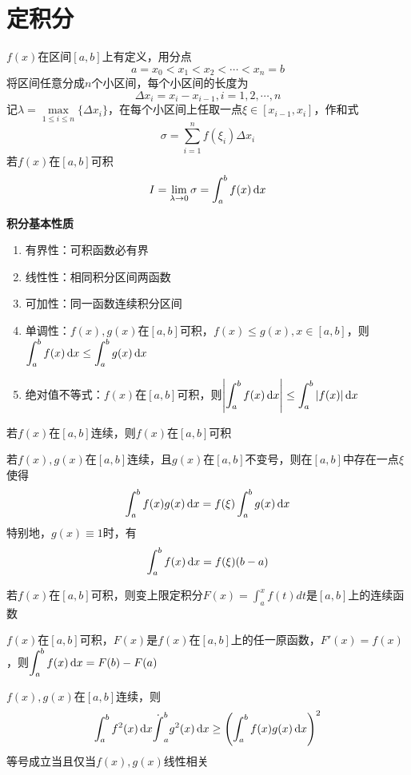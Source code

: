 
\section{定积分}
\label{sec:definite_integration}
\begin{definition}[Riemann积分]
$f(x)$在区间$[a,b]$上有定义，用分点
\[a=x_0<x_1<x_2<\cdots<x_n=b\]
将区间任意分成$n$个小区间，每个小区间的长度为
\[\Delta x_i=x_i-x_{i-1},i=1,2,\cdots,n\]
记$\lambda = \underset{1\leq i\leq n}{\max}\{\Delta x_i\}$，在每个小区间上任取一点$\xi\in[x_{i-1},x_i]$，作和式
\[\sigma = \sum_{i=1}^{n}f(\xi_i)\Delta x_i\]
若$f(x)$在$[a,b]$可积
\[I=\lim_{\lambda\to 0}\sigma=\int_a^bf(x)\,\mathrm{d} x\]
\end{definition}
\par\textbf{积分基本性质}
\begin{enumerate}
	\item 有界性：可积函数必有界
	\item 线性性：相同积分区间两函数
	\item 可加性：同一函数连续积分区间
	\item 单调性：$f(x),g(x)$在$[a,b]$可积，$f(x)\leq g(x),x\in[a,b]$，则$\displaystyle\int_{a}^{b}f(x)\,\mathrm{d} x\leq\int_{a}^{b}g(x)\,\mathrm{d} x$
	\item 绝对值不等式：$f(x)$在$[a,b]$可积，则$\displaystyle\left|\int_{a}^{b}f(x)\,\mathrm{d} x\right|\leq\int_{a}^{b}|f(x)|\,\mathrm{d} x$
\end{enumerate}
\begin{theorem}[闭区间连续函数可积定理]
若$f(x)$在$[a,b]$连续，则$f(x)$在$[a,b]$可积
\end{theorem}
\begin{theorem}[积分第一中值定理]
若$f(x),g(x)$在$[a,b]$连续，且$g(x)$在$[a,b]$不变号，则在$[a,b]$中存在一点$\xi$使得
\[\int_a^bf(x)g(x)\,\mathrm{d} x=f(\xi)\int_a^bg(x)\,\mathrm{d} x\]
特别地，$g(x)\equiv 1$时，有
\[\int_a^bf(x)\,\mathrm{d} x=f(\xi)(b-a)\]
\end{theorem}
\begin{theorem}
若$f(x)$在$[a,b]$可积，则变上限定积分$\displaystyle F(x)=\int_a^x f(t)dt$是$[a,b]$上的连续函数
\end{theorem}
\begin{theorem}[微积分基本定理]
$f(x)$在$[a,b]$可积，$F(x)$是$f(x)$在$[a,b]$上的任一原函数，$F'(x)=f(x)$，则$\displaystyle\int_{a}^{b}f(x)\,\mathrm{d} x=F(b)-F(a)$
\end{theorem}
\begin{theorem}
$f(x),g(x)$在$[a,b]$连续，则
\[\int_a^bf^2(x)\,\mathrm{d} x\dot \int_a^bg^2(x)\,\mathrm{d} x\geq\left(\int_a^bf(x)g(x)\,\mathrm{d} x\right)^2\]
等号成立当且仅当$f(x),g(x)$线性相关
\end{theorem}

